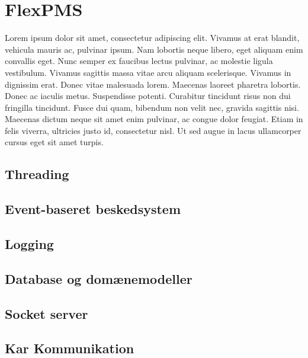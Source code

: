 \section{FlexPMS}
Lorem ipsum dolor sit amet, consectetur adipiscing elit. Vivamus at erat blandit, vehicula mauris ac, pulvinar ipsum. Nam lobortis neque libero, eget aliquam enim convallis eget. Nunc semper ex faucibus lectus pulvinar, ac molestie ligula vestibulum. Vivamus sagittis massa vitae arcu aliquam scelerisque. Vivamus in dignissim erat. Donec vitae malesuada lorem. Maecenas laoreet pharetra lobortis. Donec ac iaculis metus. Suspendisse potenti. Curabitur tincidunt risus non dui fringilla tincidunt. Fusce dui quam, bibendum non velit nec, gravida sagittis nisi. Maecenas dictum neque sit amet enim pulvinar, ac congue dolor feugiat. Etiam in felis viverra, ultricies justo id, consectetur nisl. Ut sed augue in lacus ullamcorper cursus eget sit amet turpis.\\


\subsection{Threading}


\subsection{Event-baseret beskedsystem}


\subsection{Logging}


\subsection{Database og domænemodeller}


\subsection{Socket server}


\subsection{Kar Kommunikation}

